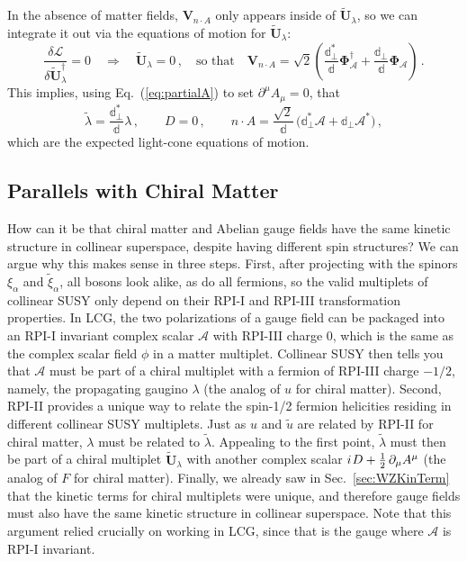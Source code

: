 \documentclass[12pt,document,nofootinbib,superscriptaddress,onecolumn,preprintnumbers,balancelastpage]{article}
\newcommand{\s}{\hspace{0.8pt}}
\newcommand{\PP}{\mathbb{d}}
\DeclareRobustCommand{\Sec}[1]{Sec.~\ref{#1}}
\DeclareRobustCommand{\Eq}[1]{Eq.~(\ref{#1})}
\newcommand{\bD}{ \boldsymbol{V}_{n \cdot A}}
\newcommand{\bPhialc}{ \boldsymbol{\Phi}_\alc}
\newcommand{\bU}{ \tilde{\boldsymbol U}}
\newcommand{\alc}{\mathcal{A}}
\begin{document}
\begin{spacing}{1.2}
In the absence of matter fields, $\bD$ only appears inside of $\bU_\lambda$, so we can integrate it out via the equations of motion for $\bU_\lambda$:
%
\begin{equation}
\label{eq:integrateoutUlambda}
 \frac{\delta \mathcal{L}}{\delta \bU_\lambda^\dagger} = 0 \quad \Longrightarrow \quad  \bU_\lambda = 0 \,, \quad  \text{so that}  \quad \bD = \sqrt{2} \left(\frac{\PP_\perp^*}{\PP} \bPhialc^\dagger + \frac{\PP_\perp}{\PP} \bPhialc \right) \,.
\end{equation}
%
This implies, using \Eq{eq:partialA} to set $\partial^\mu A_\mu = 0$, that
%
\begin{equation}
\tilde{\lambda} = \frac{\PP_\perp^*}{\PP} \lambda \,, \qquad
D = 0 \,, \qquad
n\cdot A = \frac{\sqrt{2} }{\PP}\, \big(\PP_\perp^* \alc + \PP_\perp \alc^*\big) \,,
\end{equation}
%
which are the expected light-cone equations of motion.




\subsection{Parallels with Chiral Matter}
\label{subsec:parallels}

How can it be that chiral matter and Abelian gauge fields have the same kinetic structure in collinear superspace, despite having different spin structures?
%
We can argue why this makes sense in three steps.
%
First, after projecting with the spinors $\xi_\alpha$ and $\tilde{\xi}_\alpha$, all bosons look alike, as do all fermions, so the valid multiplets of collinear SUSY only depend on their RPI-I and RPI-III transformation properties.
%
In LCG, the two polarizations of a gauge field can be packaged into an RPI-I invariant complex scalar $\alc$ with RPI-III charge 0, which is the same as the complex scalar field $\phi$ in a matter multiplet.
%
Collinear SUSY then tells you that $\alc$ must be part of a chiral multiplet with a fermion of RPI-III charge $-1/2$, namely, the propagating gaugino $\lambda$ (the analog of $u$ for chiral matter). 
%
Second, RPI-II provides a unique way to relate the spin-1/2 fermion helicities residing in different collinear SUSY multiplets.
%
Just as $u$ and $\tilde{u}$ are related by RPI-II for chiral matter, $\lambda$ must be related to $\tilde{\lambda}$.
%
Appealing to the first point, $\tilde{\lambda}$ must then be part of a chiral multiplet $\bU_\lambda$ with another complex scalar $i\s D + \frac{1}{2}\, \partial_\mu A^\mu $ (the analog of $F$ for chiral matter). 
%
Finally, we already saw in \Sec{sec:WZKinTerm} that the kinetic terms for chiral multiplets were unique, and therefore gauge fields must also have the same kinetic structure in collinear superspace.
%
Note that this argument relied crucially on working in LCG, since that is the gauge where $\alc$ is RPI-I invariant.



\end{spacing}
\end{document}
